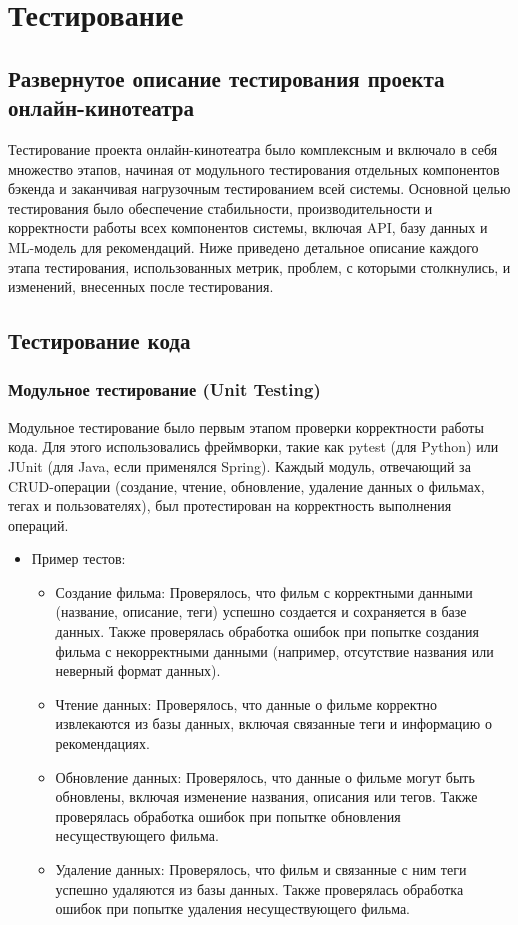 \chapter{Тестирование}
\label{ch:testing}

\section{Развернутое описание тестирования проекта онлайн-кинотеатра}

Тестирование проекта онлайн-кинотеатра было комплексным и включало в себя множество этапов, начиная от модульного тестирования отдельных компонентов бэкенда и заканчивая нагрузочным тестированием всей системы. Основной целью тестирования было обеспечение стабильности, производительности и корректности работы всех компонентов системы, включая API, базу данных и ML-модель для рекомендаций. Ниже приведено детальное описание каждого этапа тестирования, использованных метрик, проблем, с которыми столкнулись, и изменений, внесенных после тестирования.

\section{Тестирование кода}

\subsection*{Модульное тестирование (Unit Testing)}
Модульное тестирование было первым этапом проверки корректности работы кода. Для этого использовались фреймворки, такие как pytest (для Python) или JUnit (для Java, если применялся Spring). Каждый модуль, отвечающий за CRUD-операции (создание, чтение, обновление, удаление данных о фильмах, тегах и пользователях), был протестирован на корректность выполнения операций.

\begin{itemize}
    \item Пример тестов:
    \begin{itemize}
        \item Создание фильма: Проверялось, что фильм с корректными данными (название, описание, теги) успешно создается и сохраняется в базе данных. Также проверялась обработка ошибок при попытке создания фильма с некорректными данными (например, отсутствие названия или неверный формат данных).
        \item Чтение данных: Проверялось, что данные о фильме корректно извлекаются из базы данных, включая связанные теги и информацию о рекомендациях.
        \item Обновление данных: Проверялось, что данные о фильме могут быть обновлены, включая изменение названия, описания или тегов. Также проверялась обработка ошибок при попытке обновления несуществующего фильма.
        \item Удаление данных: Проверялось, что фильм и связанные с ним теги успешно удаляются из базы данных. Также проверялась обработка ошибок при попытке удаления несуществующего фильма.
    \end{itemize}
\end{itemize}

